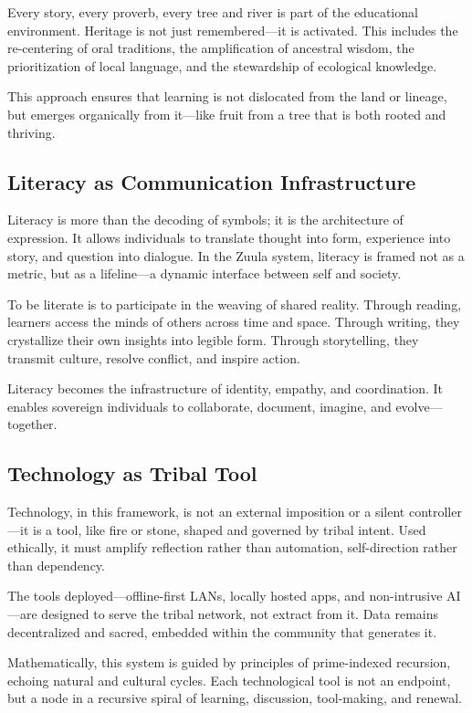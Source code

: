 \documentclass[12pt]{article}
\begin{document}
Every story, every proverb, every tree and river is part of the educational environment. Heritage is not just remembered—it is activated. This includes the re-centering of oral traditions, the amplification of ancestral wisdom, the prioritization of local language, and the stewardship of ecological knowledge.

This approach ensures that learning is not dislocated from the land or lineage, but emerges organically from it—like fruit from a tree that is both rooted and thriving.

\subsection*{Literacy as Communication Infrastructure}

Literacy is more than the decoding of symbols; it is the architecture of expression. It allows individuals to translate thought into form, experience into story, and question into dialogue. In the Zuula system, literacy is framed not as a metric, but as a lifeline—a dynamic interface between self and society.

To be literate is to participate in the weaving of shared reality. Through reading, learners access the minds of others across time and space. Through writing, they crystallize their own insights into legible form. Through storytelling, they transmit culture, resolve conflict, and inspire action.

Literacy becomes the infrastructure of identity, empathy, and coordination. It enables sovereign individuals to collaborate, document, imagine, and evolve—together.

\subsection*{Technology as Tribal Tool}

Technology, in this framework, is not an external imposition or a silent controller—it is a tool, like fire or stone, shaped and governed by tribal intent. Used ethically, it must amplify reflection rather than automation, self-direction rather than dependency.

The tools deployed—offline-first LANs, locally hosted apps, and non-intrusive AI—are designed to serve the tribal network, not extract from it. Data remains decentralized and sacred, embedded within the community that generates it.

Mathematically, this system is guided by principles of prime-indexed recursion, echoing natural and cultural cycles. Each technological tool is not an endpoint, but a node in a recursive spiral of learning, discussion, tool-making, and renewal.
\end{document}
